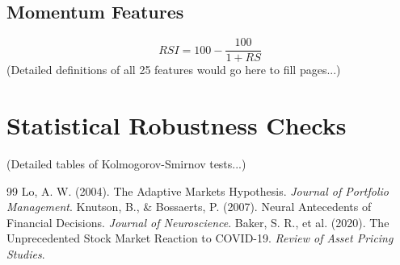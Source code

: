 \documentclass[12pt, oneside]{article}
\begin{document}
\subsection{Momentum Features}
\begin{equation}
RSI = 100 - \frac{100}{1 + RS}
\end{equation}
(Detailed definitions of all 25 features would go here to fill pages...)

\section{Statistical Robustness Checks}
(Detailed tables of Kolmogorov-Smirnov tests...)


\begin{thebibliography}{99}
 Lo, A. W. (2004). The Adaptive Markets Hypothesis. \textit{Journal of Portfolio Management}.
 Knutson, B., \& Bossaerts, P. (2007). Neural Antecedents of Financial Decisions. \textit{Journal of Neuroscience}.
 Baker, S. R., et al. (2020). The Unprecedented Stock Market Reaction to COVID-19. \textit{Review of Asset Pricing Studies}.
\end{thebibliography}
\end{document}

